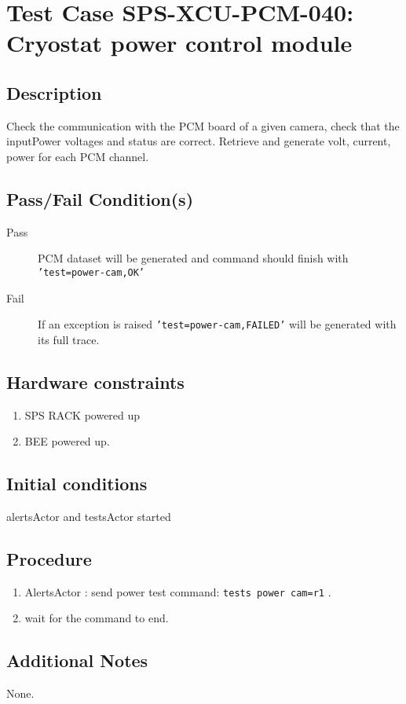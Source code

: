 \section{Test Case SPS-XCU-PCM-040: Cryostat power control module}

\subsection{Description}

Check the communication with the PCM board of a given camera, check that the inputPower voltages and status are correct.
Retrieve and generate volt, current, power for each PCM channel.

\subsection{Pass/Fail Condition(s)}

\begin{description}
\item [Pass] PCM dataset will be generated and command should finish with \texttt{'test=power-cam,OK'}
\item [Fail] If an exception is raised \texttt{'test=power-cam,FAILED'} will be generated with its full trace.

\end{description}

\subsection{Hardware constraints}

\begin{enumerate}
    \item SPS RACK powered up
    \item BEE powered up.
\end{enumerate}

\subsection{Initial conditions}

alertsActor and testsActor started

\subsection{Procedure}

\begin{enumerate}
    \item AlertsActor : send power test command: \texttt{tests power cam=r1} .
    \item wait for the command to end.
\end{enumerate}

\subsection{Additional Notes}
None.
